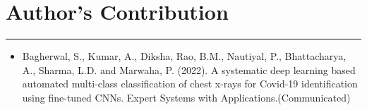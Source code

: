 \chapter{Author's Contribution} \label{C1} 
\noindent\rule{\linewidth}{2pt}

\begin{itemize}
    \item [{[1]}] Bagherwal, S., Kumar, A., Diksha, Rao, B.M., Nautiyal, P., Bhattacharya, A., Sharma, L.D. and Marwaha, P. (2022). A systematic deep learning based automated multi-class classification of chest x-rays for Covid-19 identification using fine-tuned CNNs. Expert Systems with Applications.(Communicated)
\end{itemize}
